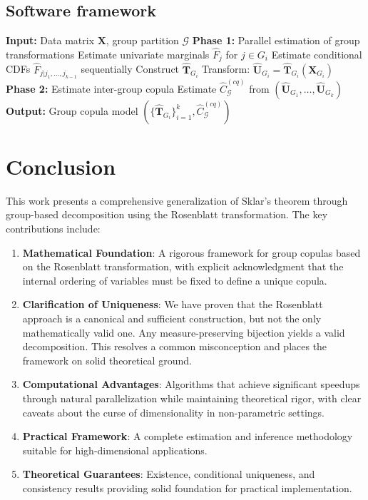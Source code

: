\subsection{Software framework}
\begin{algorithm}[H]
\caption{Parallel Group Copula Estimation}
\begin{algorithmic}[1]
\State \textbf{Input:} Data matrix $\mathbf{X}$, group partition $\mathcal{G}$
\State \textbf{Phase 1:} Parallel estimation of group transformations
    \State Estimate univariate marginals $\hat{F}_j$ for $j \in G_i$
    \State Estimate conditional CDFs $\hat{F}_{j|j_1,\ldots,j_{k-1}}$ sequentially
    \State Construct $\hat{\mathbf{T}}_{G_i}$
    \State Transform: $\hat{\mathbf{U}}_{G_i} = \hat{\mathbf{T}}_{G_i}(\mathbf{X}_{G_i})$
\EndFor
\State \textbf{Phase 2:} Estimate inter-group copula
\State Estimate $\hat{C}_{\mathcal{G}}^{(cq)}$ from $(\hat{\mathbf{U}}_{G_1}, \ldots, \hat{\mathbf{U}}_{G_k})$
\State \textbf{Output:} Group copula model $(\{\hat{\mathbf{T}}_{G_i}\}_{i=1}^k, \hat{C}_{\mathcal{G}}^{(cq)})$
\end{algorithmic}
\end{algorithm}

\section{Conclusion}
This work presents a comprehensive generalization of Sklar's theorem through group-based decomposition using the Rosenblatt transformation. The key contributions include:
\begin{enumerate}
    \item \textbf{Mathematical Foundation}: A rigorous framework for group copulas based on the Rosenblatt transformation, with explicit acknowledgment that the internal ordering of variables must be fixed to define a unique copula.
    \item \textbf{Clarification of Uniqueness}: We have proven that the Rosenblatt approach is a canonical and sufficient construction, but not the only mathematically valid one. Any measure-preserving bijection yields a valid decomposition. This resolves a common misconception and places the framework on solid theoretical ground.
    \item \textbf{Computational Advantages}: Algorithms that achieve significant speedups through natural parallelization while maintaining theoretical rigor, with clear caveats about the curse of dimensionality in non-parametric settings.
    \item \textbf{Practical Framework}: A complete estimation and inference methodology suitable for high-dimensional applications.
    \item \textbf{Theoretical Guarantees}: Existence, conditional uniqueness, and consistency results providing solid foundation for practical implementation.
\end{enumerate}

